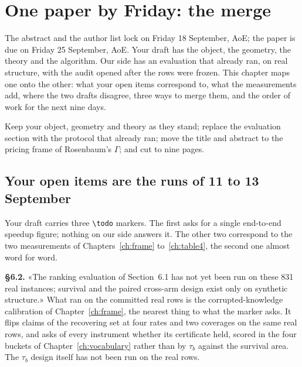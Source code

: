 \chapter{One paper by Friday: the merge}
\label{ch:merge}

The abstract and the author list lock on Friday 18 September, AoE; the paper is due on Friday 25
September, AoE. Your draft has the object, the geometry, the theory and the algorithm. Our side has an
evaluation that already ran, on real structure, with the audit opened after the rows were frozen. This
chapter maps one onto the other: what your open items correspond to, what the measurements add, where the
two drafts disagree, three ways to merge them, and the order of work for the next nine days.

\begin{ideia}
Keep your object, geometry and theory as they stand; replace the evaluation section with the protocol that
already ran; move the title and abstract to the pricing frame of Rosenbaum's $\Gamma$; and cut to nine
pages.
\end{ideia}

\begin{antes}
\end{antes}

\section{Your open items are the runs of 11 to 13 September}

Your draft carries three \texttt{\textbackslash todo} markers. The first asks for a single end-to-end
speedup figure; nothing on our side answers it. The other two correspond to the two measurements of
Chapters~\ref{ch:frame} to~\ref{ch:table4}, the second one almost word for word.

\textbf{\S6.2.} «The ranking evaluation of Section~6.1 has not yet been run on these 831 real instances;
survival and the paired cross-arm design exist only on synthetic structure.» What ran on the committed real
rows is the corrupted-knowledge calibration of Chapter~\ref{ch:frame}, the nearest thing to what the
marker asks. It flips claims of the recovering set at four rates and two coverages on the same real rows,
and asks of every instrument whether its certificate held, scored in the four buckets of
Chapter~\ref{ch:vocabulary} rather than by $\tau_b$ against the survival area. The $\tau_b$ design itself
has not been run on the real rows.

